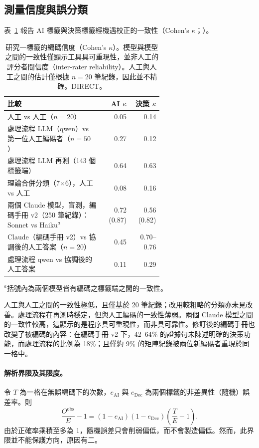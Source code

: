 \subsection{測量信度與誤分類}
\label{zh:sec:study1_reliability}

表~\ref{zh:tab:reliability} 報告 AI 標籤與決策標籤經機遇校正的一致性（Cohen's $\kappa$；\citealp{cohen1960coefficient}）。

\begin{table}[tbp]
  \centering
  \small
  \caption{研究一標籤的編碼信度（Cohen's $\kappa$）。模型與模型之間的一致性僅顯示工具具可重現性，並非人工的評分者間信度（inter-rater reliability）。人工與人工之間的估計僅根據 $n = 20$ 筆紀錄，因此並不精確。DIRECT。}
  \label{zh:tab:reliability}
  \begin{tabular}{p{0.62\linewidth}rr}
    \toprule
    比較 & AI $\kappa$ & 決策 $\kappa$ \\
    \midrule
    人工 vs 人工（$n = 20$） & 0.05 & 0.14 \\
    處理流程 LLM（qwen）vs 第一位人工編碼者（$n = 50$） & 0.27 & 0.12 \\
    處理流程 LLM 再測（143 個標籤端） & 0.64 & 0.63 \\
    理論合併分類（7$\times$6），人工 vs 人工 & 0.08 & 0.16 \\
    兩個 Claude 模型，盲測，編碼手冊 v2（250 筆紀錄）：Sonnet vs Haiku$^{a}$ & 0.72 (0.87) & 0.56 (0.82) \\
    Claude（編碼手冊 v2）vs 協調後的人工答案（$n = 20$） & 0.45 & 0.70--0.76 \\
    處理流程 qwen vs 協調後的人工答案 & 0.11 & 0.29 \\
    \bottomrule
  \end{tabular}

  \smallskip
  \raggedright\footnotesize $^{a}$括號內為兩個模型皆有編碼之標籤端之間的一致性。
\end{table}

人工與人工之間的一致性極低，且僅基於 20 筆紀錄；改用較粗略的分類亦未見改善。處理流程在再測時穩定，但與人工編碼的一致性薄弱。兩個 Claude 模型之間的一致性較高，這顯示的是程序具可重現性，而非具可靠性。修訂後的編碼手冊也改變了被編碼的內容：在編碼手冊 v2 下，42--64\% 的證據句未陳述明確的決策功能，而處理流程的比例為 18\%；且僅約 9\% 的矩陣紀錄被兩位新編碼者重現於同一格中。

\paragraph{解析界限及其限度。} 令 $T$ 為一格在無誤編碼下的次數，$e_{\mathrm{AI}}$ 與 $e_{\mathrm{Dec}}$ 為兩個標籤的非差異性（隨機）誤差率。則
\begin{equation}
\frac{O^{\mathrm{obs}}}{E} - 1 = (1 - e_{\mathrm{AI}})(1 - e_{\mathrm{Dec}})\left(\frac{T}{E} - 1\right).
\label{zh:eq:attenuation}
\end{equation}
由於正確率乘積至多為 1，隨機誤差只會削弱偏低，而不會製造偏低。然而，此界限並不能保護方向，原因有二。

